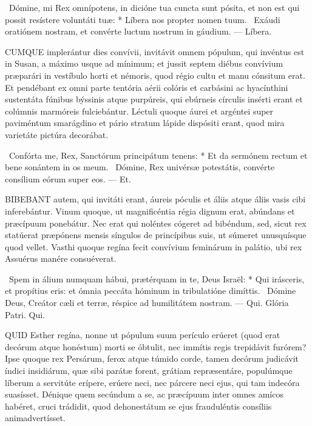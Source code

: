 \R\ Dómine, mi Rex omnípotens, in dicióne tua cuncta sunt pósita, et non est qui possit resístere voluntáti tuæ: * Líbera nos propter nomen tuum. \V\ Exáudi oratiónem nostram, et convérte luctum nostrum in gáudium. — Líbera.


\lettrine[lines=2]{C}{UMQUE} implerántur dies convívii, invitávit omnem pópulum, qui invéntus est in Susan, a máximo usque ad mínimum; et jussit septem diébus convívium præparári in vestíbulo horti et némoris, quod régio cultu et manu cónsitum erat. Et pendébant ex omni parte tentória aérii colóris et carbásini ac hyacínthini sustentáta fúnibus býssinis atque purpúreis, qui ebúrneis círculis insérti erant et colúmnis marmóreis fulciebántur. Léctuli quoque áurei et argéntei super paviméntum smarágdino et pário stratum lápide dispósiti erant, quod mira varietáte pictúra decorábat.

\R\ Confórta me, Rex, Sanctórum principátum tenens: * Et da sermónem rectum et bene sonántem in os meum. \V\ Dómine, Rex univérsæ potestátis, convérte consílium eórum super eos. — Et.


\lettrine[lines=2]{B}{IBEBANT} autem, qui invitáti erant, áureis póculis et áliis atque áliis vasis cibi inferebántur. Vinum quoque, ut magnificéntia régia dignum erat, abúndans et præcípuum ponebátur. Nec erat qui noléntes cógeret ad bibéndum, sed, sicut rex statúerat præpónens mensis síngulos de princípibus suis, ut súmeret unusquísque quod vellet. Vasthi quoque regína fecit convívium feminárum in palátio, ubi rex Assuérus manére consuéverat.

\R\ Spem in álium numquam hábui, prætérquam in te, Deus Israël: * Qui irásceris, et propítius eris: et ómnia peccáta hóminum in tribulatióne dimíttis. \V\ Dómine Deus, Creátor cæli et terræ, réspice ad humilitátem nostram. — Qui. Glória Patri. Qui.




\lettrine[lines=2]{Q}{UID} Esther regína, nonne ut pópulum suum perículo erúeret (quod erat decórum atque honéstum) morti se óbtulit, nec immítis regis trepidávit furórem? Ipse quoque rex Persárum, ferox atque túmido corde, tamen decórum judicávit índici insidiárum, quæ sibi parátæ forent, grátiam repræsentáre, populúmque líberum a servitúte erípere, erúere neci, nec párcere neci ejus, qui tam indecóra suasísset. Dénique quem secúndum a se, ac præcípuum inter omnes amícos habéret, cruci trádidit, quod dehonestátum se ejus frauduléntis consíliis animadvertísset.

